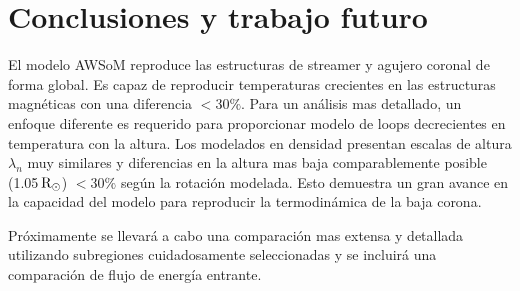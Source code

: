 \documentclass[baaa]{baaa}
\begin{document}

\section{Conclusiones y trabajo futuro}

El modelo AWSoM reproduce las estructuras de streamer y agujero coronal de forma global. Es capaz de reproducir temperaturas crecientes en las estructuras magnéticas con una diferencia $<30 \%$. Para un análisis mas detallado, un enfoque diferente es requerido para proporcionar modelo de loops decrecientes en temperatura con la altura. Los modelados en densidad presentan escalas de altura $\lambda_n$ muy similares y diferencias en la altura mas baja comparablemente posible (1.05$\,{\rm R_\odot}$) $<30 \%$ según la rotación modelada. Esto demuestra un gran avance en la capacidad del modelo para reproducir la termodinámica de la baja corona.

Próximamente se llevará a cabo una comparación mas extensa y detallada utilizando subregiones cuidadosamente seleccionadas y se incluirá una comparación de flujo de energía entrante.





\small

 
\end{document}
